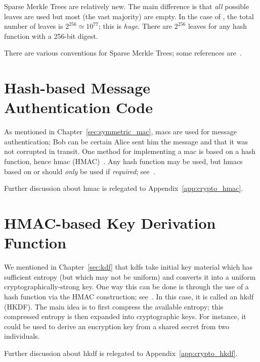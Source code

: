 Sparse Merkle Trees are relatively new.
The main difference is that \emph{all} possible leaves are used
but most (the vast majority) are empty.
In the case of \ShaTwo{}, the total number of leaves is
$2^{256}\simeq 10^{77}$;
this is \emph{huge}.
There are $2^{256}$ leaves for any \gls{hash function} with a 256-bit digest.

There are various conventions for Sparse Merkle Trees;
some references are~\cite{EfficientSMT,CompactSMT,CompactMerkleMultiproofs,
RevocationTransparency2012,AngelaSMT}.



\section{Hash-based Message Authentication Code}
\label{sec:hash_hmac}

As mentioned in Chapter~\ref{sec:symmetric_mac},
\glspl{mac} are used for message authentication;
Bob can be certain Alice sent him the message and that it was not
corrupted in transit.
One method for implementing a \gls{mac} is based on a \gls{hash function},
hence \gls{hmac} (HMAC)~\cite{HMAC1996,rfc2104}.
Any \gls{hash function} may be used,
but \glspl{hmac} based on \MDFive{} or \ShaOne{} should \emph{only}
be used if \emph{required}; see~\cite{rfc6151}.

Further discussion about \gls{hmac} is relegated to
Appendix~\ref{app:crypto_hmac}.



\section{HMAC-based Key Derivation Function}
\label{sec:hash_hkdf}

We mentioned in Chapter~\ref{sec:kdf} that \glspl{kdf}
take initial key material which
has sufficient entropy (but which may not be uniform)
and converts it into a uniform cryptographically-strong key.
One way this can be done is through the use of a \gls{hash function}
via the HMAC construction; see~\cite{HKDF2010,rfc5869}.
In this case, it is called an \gls{hkdf} (HKDF).
The main idea is to first compress the available entropy;
this compressed entropy is then expanded into cryptographic keys.
For instance, it could be used to derive an encryption key
from a \gls{shared secret} from two individuals.

Further discussion about \gls{hkdf} is relegated to
Appendix~\ref{app:crypto_hkdf}.



